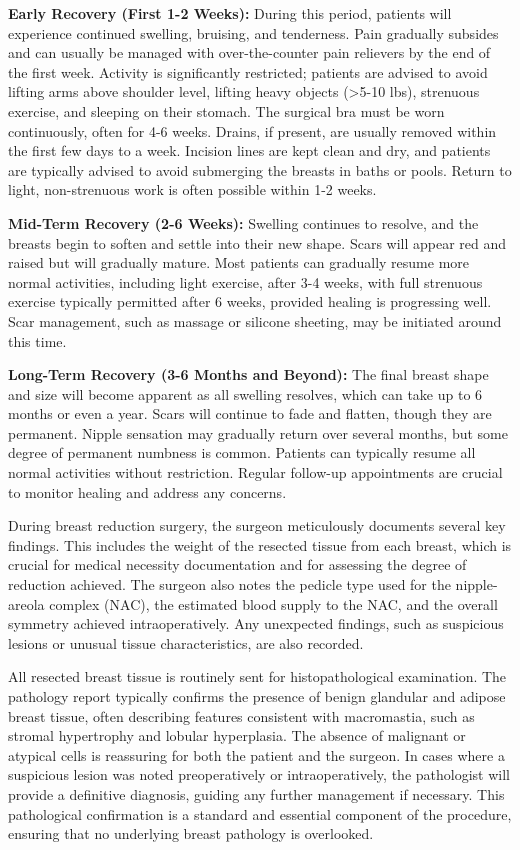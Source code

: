 \textbf{Early Recovery (First 1-2 Weeks):}
During this period, patients will experience continued swelling, bruising, and tenderness. Pain gradually subsides and can usually be managed with over-the-counter pain relievers by the end of the first week. Activity is significantly restricted; patients are advised to avoid lifting arms above shoulder level, lifting heavy objects (>5-10 lbs), strenuous exercise, and sleeping on their stomach. The surgical bra must be worn continuously, often for 4-6 weeks. Drains, if present, are usually removed within the first few days to a week. Incision lines are kept clean and dry, and patients are typically advised to avoid submerging the breasts in baths or pools. Return to light, non-strenuous work is often possible within 1-2 weeks.

\textbf{Mid-Term Recovery (2-6 Weeks):}
Swelling continues to resolve, and the breasts begin to soften and settle into their new shape. Scars will appear red and raised but will gradually mature. Most patients can gradually resume more normal activities, including light exercise, after 3-4 weeks, with full strenuous exercise typically permitted after 6 weeks, provided healing is progressing well. Scar management, such as massage or silicone sheeting, may be initiated around this time.

\textbf{Long-Term Recovery (3-6 Months and Beyond):}
The final breast shape and size will become apparent as all swelling resolves, which can take up to 6 months or even a year. Scars will continue to fade and flatten, though they are permanent. Nipple sensation may gradually return over several months, but some degree of permanent numbness is common. Patients can typically resume all normal activities without restriction. Regular follow-up appointments are crucial to monitor healing and address any concerns.

During breast reduction surgery, the surgeon meticulously documents several key findings. This includes the weight of the resected tissue from each breast, which is crucial for medical necessity documentation and for assessing the degree of reduction achieved. The surgeon also notes the pedicle type used for the nipple-areola complex (NAC), the estimated blood supply to the NAC, and the overall symmetry achieved intraoperatively. Any unexpected findings, such as suspicious lesions or unusual tissue characteristics, are also recorded.

All resected breast tissue is routinely sent for histopathological examination. The pathology report typically confirms the presence of benign glandular and adipose breast tissue, often describing features consistent with macromastia, such as stromal hypertrophy and lobular hyperplasia. The absence of malignant or atypical cells is reassuring for both the patient and the surgeon. In cases where a suspicious lesion was noted preoperatively or intraoperatively, the pathologist will provide a definitive diagnosis, guiding any further management if necessary. This pathological confirmation is a standard and essential component of the procedure, ensuring that no underlying breast pathology is overlooked.

